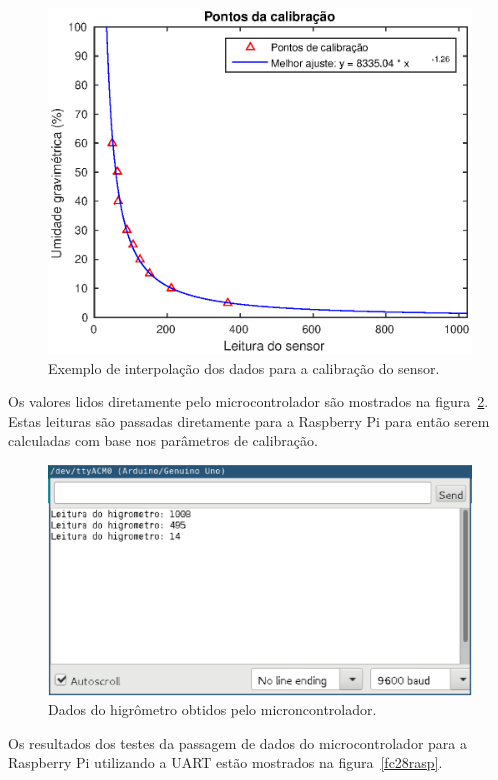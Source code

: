 			\begin{figure}[!htbp]
			\begin{center}
			\includegraphics[width=.7\textwidth]{figuras/calibration.eps}
			\caption{\label{fig:calibration}Exemplo de interpolação dos dados para a calibração do sensor.}
			\end{center}
			\end{figure}

			Os valores lidos diretamente pelo microcontrolador são mostrados na figura~\ref{fig:fc28ardu}.
			Estas leituras são passadas diretamente para a Raspberry Pi para então serem
			calculadas com base nos parâmetros de calibração.

			\begin{figure}[!htbp]
			\begin{center}
			\includegraphics[width=.8\textwidth]{figuras/fc28_arduino.eps}
			\caption{\label{fig:fc28ardu}Dados do higrômetro obtidos pelo microncontrolador.}
			\end{center}
			\end{figure}

			Os resultados dos testes da passagem de dados do microcontrolador para a Raspberry Pi utilizando a UART
			estão mostrados na figura~\ref{fc28rasp}.

